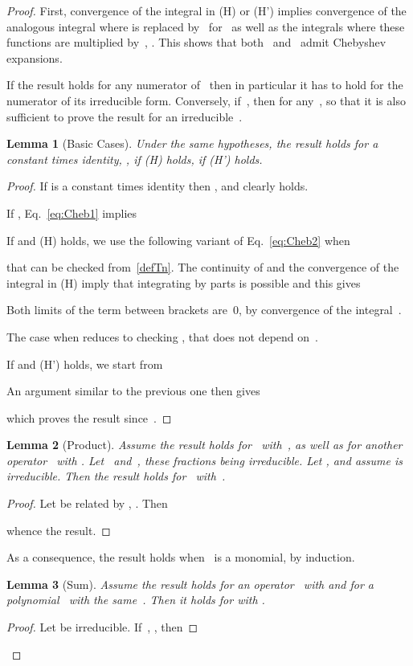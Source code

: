 \documentclass{amsart}
\newtheorem{lemma}{Lemma}
\theoremstyle{definition}
\begin{document}
\begin{proof}
First, convergence of the integral in (H) or (H') implies convergence of the analogous integral where  is replaced by~ for~ as well as the integrals where these functions are multiplied by~, . This shows that both~ and~ admit Chebyshev expansions.

If the result holds for any numerator of~ then in particular it has to hold for the numerator of its irreducible form.
Conversely, if~, then  for any~, so that it is also sufficient to prove the result for an irreducible~.

\begin{lemma}[Basic Cases] Under the same hypotheses, the result holds for  a constant times identity, ,  if (H) holds,  if (H') holds.
\end{lemma}
\begin{proof}
If  is a constant times identity then ,  and  clearly holds.

If ,  Eq.~\eqref{eq:Cheb1} implies


If  and (H) holds, 
we use the following variant of Eq.~\eqref{eq:Cheb2} when 

that can be checked from~\eqref{defTn}. The continuity of  and the convergence of the integral in (H) imply that integrating by parts is possible and this gives

Both limits of the term between brackets are~0, by convergence of the integral~.

The case when  reduces to checking , that does not depend on~.

If  and (H') holds, we start from

An argument similar to the previous one then gives

which proves the result since~.
\end{proof}
\begin{lemma}[Product]\label{product}
Assume the result holds for~ with~, as well as for another operator~ with .
Let~ and~, these fractions being irreducible.
Let , and assume  is irreducible. Then the result holds for~ with~.
\end{lemma}
\begin{proof}
Let  be related by , . Then

whence the result.
\end{proof}
As a consequence, the result holds when~ is a monomial, by induction.





\begin{lemma}[Sum]\label{sum}Assume the result holds for an operator~ with  and for a polynomial~ with the same~. Then it holds for  with .
\end{lemma}
\begin{proof}
Let  be irreducible.
If~, , then
 

\end{proof}
\end{proof}
\end{document}
